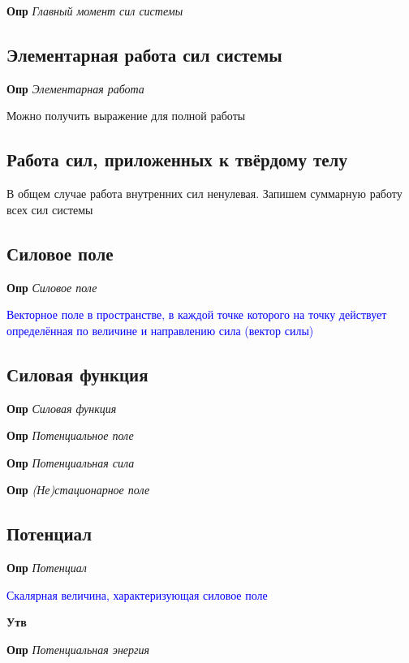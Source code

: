\documentclass[a4paper, 14pt]{article}
\begin{document}
    \textbf{Опр} \textit{Главный момент сил системы}
    
    \subsection{Элементарная работа сил системы}
    
    \textbf{Опр} \textit{Элементарная работа}
    
    Можно получить выражение для полной работы
    
    \subsection{Работа сил, приложенных к твёрдому телу}
    
    В общем случае работа внутренних сил ненулевая.
    Запишем суммарную работу всех сил системы
    
    \subsection{Силовое поле}
    
    \textbf{Опр} \textit{Силовое поле}
    
    \textcolor{blue}{Векторное поле в пространстве, в каждой точке которого на точку действует определённая
    по величине и направлению сила (вектор силы)}
    
    \subsection{Силовая функция}
    
    \textbf{Опр} \textit{Силовая функция}
    
    \textbf{Опр} \textit{Потенциальное поле}
    
    \textbf{Опр} \textit{Потенциальная сила}
    
    \textbf{Опр} \textit{(Не)стационарное поле}
    
    \subsection{Потенциал}
    
    \textbf{Опр} \textit{Потенциал}
    
    \textcolor{blue}{Скалярная величина, характеризующая силовое поле}
    
    \textbf{Утв}
    
    \textbf{Опр} \textit{Потенциальная энергия}
    
\end{document}
